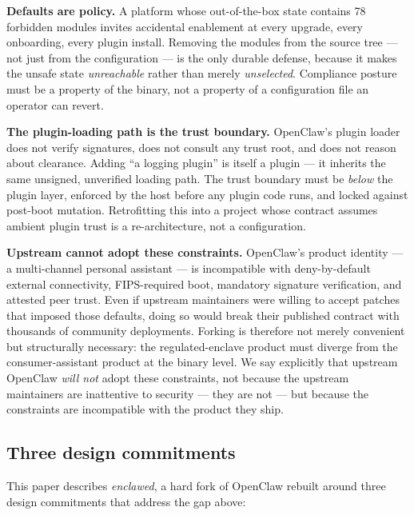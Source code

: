 \documentclass[11pt]{article}
\begin{document}
\textbf{Defaults are policy.} A platform whose out-of-the-box state
contains 78 forbidden modules invites accidental enablement at every
upgrade, every onboarding, every plugin install. Removing the modules
from the source tree --- not just from the configuration --- is the
only durable defense, because it makes the unsafe state
\emph{unreachable} rather than merely \emph{unselected}. Compliance
posture must be a property of the binary, not a property of a
configuration file an operator can revert.

\textbf{The plugin-loading path is the trust boundary.} OpenClaw's
plugin loader does not verify signatures, does not consult any trust
root, and does not reason about clearance. Adding ``a logging plugin''
is itself a plugin --- it inherits the same unsigned, unverified
loading path. The trust boundary must be \emph{below} the plugin
layer, enforced by the host before any plugin code runs, and locked
against post-boot mutation. Retrofitting this into a project whose
contract assumes ambient plugin trust is a re-architecture, not a
configuration.

\textbf{Upstream cannot adopt these constraints.} OpenClaw's product
identity --- a multi-channel personal assistant --- is incompatible
with deny-by-default external connectivity, FIPS-required boot,
mandatory signature verification, and attested peer trust. Even if
upstream maintainers were willing to accept patches that imposed those
defaults, doing so would break their published contract with thousands
of community deployments. Forking is therefore not merely convenient
but structurally necessary: the regulated-enclave product must diverge
from the consumer-assistant product at the binary level. We say
explicitly that upstream OpenClaw \emph{will not} adopt these
constraints, not because the upstream maintainers are inattentive to
security --- they are not --- but because the constraints are
incompatible with the product they ship.

\subsection{Three design commitments}

This paper describes \emph{enclawed}, a hard fork of OpenClaw rebuilt
around three design commitments that address the gap above:
\end{document}
